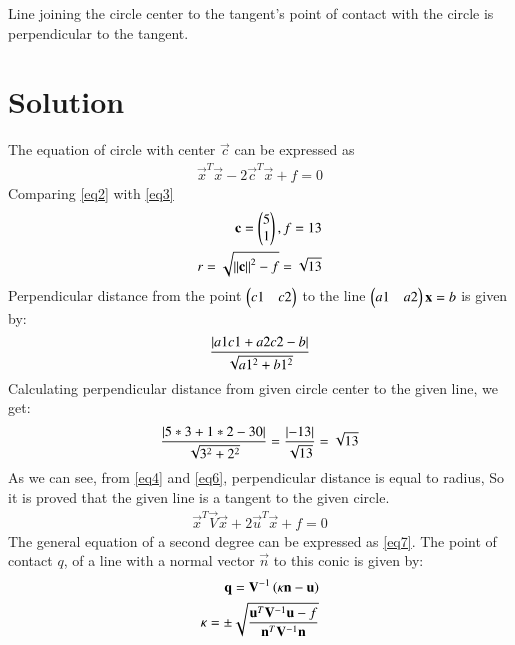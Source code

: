 \documentclass[journal,12pt,twocolumn]{IEEEtran}
\begin{document}
Line joining the circle center to the tangent's point of contact with the circle is perpendicular to the tangent. 

\section{Solution}



The equation of circle with center $\vec{c}$ can be expressed as
\begin{align}
    \vec{x}^T\vec{x}-2\vec{c}^T\vec{x}+f = 0 \label{eq3}
\end{align}
Comparing \eqref{eq2} with \eqref{eq3}
\begin{align}
\mathbf{c}=\begin{pmatrix}5 \\ 1\end{pmatrix},f=13 \\ 
 r=\sqrt{\left\lVert\mathbf{c}\right\rVert^2-f} = \sqrt{13} \label{eq4}
\end{align}
Perpendicular distance from the point $\begin{pmatrix}c1 & c2\end{pmatrix}$ to the line $\begin{pmatrix}a1 & a2\end{pmatrix}\mathbf{x}= b$ is given by:
\begin{align}\label{eq5}
 \frac{\left\vert a1c1 + a2c2 - b\right\vert}{\sqrt{a1^2 + b1^2}}
\end{align}
Calculating perpendicular distance from given circle center to the given line, we get:
\begin{align}\label{eq6}
 \frac{\left\vert5*3 + 1*2 - 30\right\vert}{\sqrt{3^2 + 2^2}} =  \frac{\left\vert-13\right\vert}{\sqrt{13}} =  \sqrt{13}
\end{align}
As we can see, from \eqref{eq4} and \eqref{eq6}, perpendicular distance is equal to radius, So it is proved that the given line is a tangent to the given circle.
\begin{align}\label{eq7}
\vec{x}^T\vec{V}\vec{x}+2\vec{u}^T\vec{x}+f=0
\end{align}
The general equation of a second degree can be expressed as \eqref{eq7}. The point of contact $q$, of a line with a normal vector $\vec{n}$ to this conic is given by:
\begin{align}
\mathbf{q} = \mathbf{V}^{-1}\left(\kappa \mathbf{n}-\mathbf{u}\right) \label{eq8} \\
\kappa = \pm \sqrt{\frac{\mathbf{u}^T\mathbf{V}^{-1}\mathbf{u}-f}{\mathbf{n}^T\mathbf{V}^{-1}\mathbf{n}}} \label{eq9}
\end{align}
\end{document}
